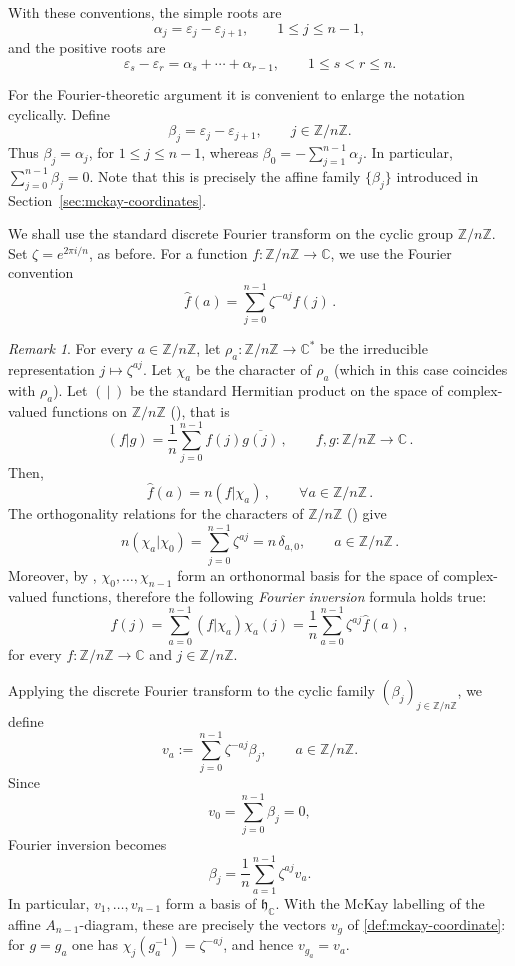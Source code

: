 \documentclass[a4paper,reqno]{amsart}
\theoremstyle{plain} %
\theoremstyle{definition} %
\theoremstyle{remark} %
\newtheorem{rmk}[thm]{Remark}
\newcommand{\Z}{\mathbb{Z}}
\newcommand{\C}{\mathbb{C}}
\newcommand{\z}{\zeta}
\newcommand{\ve}{{\varepsilon}}
\newcommand{\1}{\mathds{1}}   %
\begin{document}
With these conventions, the simple roots are
\[
\alpha_j= \ve_j - \ve_{j+1},
\qquad 1\leq j\leq n-1,
\]
and the positive roots are
\[
\ve_s - \ve_r
=
\alpha_s+\cdots+\alpha_{r-1},
\qquad 1\leq s<r\leq n.
\]

For the Fourier-theoretic argument it is convenient to enlarge the
notation cyclically.  Define
\[
\beta_j = \ve_j - \ve_{j+1},
\qquad j\in\mathbb Z/n\mathbb Z.
\]
Thus $\beta_j=\alpha_j$, for $1\leq j\leq n-1$, whereas $\beta_0=-\sum_{j=1}^{n-1}\alpha_j$.
In particular, $\sum_{j=0}^{n-1}\beta_j=0$. 
Note that this is precisely the affine family \(\{\beta_j\}\) introduced in Section~\ref{sec:mckay-coordinates}.

We shall use the standard discrete Fourier transform on the cyclic
group $\mathbb Z/n\mathbb Z$.  Set $\z=e^{2\pi i/n}$, as before. 
For a function $f:\mathbb Z/n\mathbb Z\to\mathbb C$, we use the
Fourier convention
\[
\widehat f(a)
=
\sum_{j=0}^{n-1}\z^{-aj}f(j) \, .
\]
\begin{rmk}\label{FTRT}
For every $a\in \mathbb Z/n\mathbb Z$, let $\rho_a \colon \mathbb Z/n\mathbb Z \to \C^\ast$ be the irreducible representation
$j\mapsto \z^{aj}$. Let $\chi_a$ be the character of $\rho_a$ (which in this case coincides with $\rho_a$).
Let $(\, | \, )$ be the standard Hermitian product on the space of complex-valued functions on $\mathbb Z/n\mathbb Z$
(\cite[Sec. 2.3]{Serre77}), that is
\[
(f|g) = \frac{1}{n}\sum_{j=0}^{n-1}f(j)\overline{g(j)} \, , \qquad f, g \colon \mathbb Z/n\mathbb Z \to \C \, .
\]
Then, 
\[
\widehat f(a) = n(f|\chi_a) \, , \qquad \forall a\in \Z/n\Z \, .
\] 
The orthogonality relations for the characters of $\mathbb Z/n\mathbb Z$ (\cite[Thm. 3, Sec. 2.3]{Serre77}) give
\begin{equation}\label{ORC}
n(\chi_a | \chi_0)=\sum_{j=0}^{n-1}\z^{aj}
=
n\,\delta_{a,0},
\qquad a\in\mathbb Z/n\mathbb Z \, .
\end{equation}
Moreover, by \cite[Thm. 6, Sec. 2.5]{Serre77}, $\chi_0, \ldots, \chi_{n-1}$ form an orthonormal basis 
for the space of complex-valued functions, therefore the following \textit{Fourier inversion} formula holds true:
\begin{equation}\label{FI}
f(j)
= \sum_{a=0}^{n-1}(f|\chi_a)\chi_a(j)=
\frac1n\sum_{a=0}^{n-1}\z^{aj}\widehat f(a) \, ,
\end{equation}
for every $f\colon \Z/n\Z \to \C$ and $j\in \Z/n\Z$.
\end{rmk}
Applying the discrete Fourier transform to the cyclic family
$(\beta_j)_{j\in\mathbb Z/n\mathbb Z}$, we define
\[
v_a
:=
\sum_{j=0}^{n-1}\z^{-aj}\beta_j,
\qquad a\in\mathbb Z/n\mathbb Z.
\]
Since
\[
v_0=\sum_{j=0}^{n-1}\beta_j=0,
\]
Fourier inversion becomes
\begin{equation}\label{FIb}
\beta_j
=
\frac1n\sum_{a=1}^{n-1}\z^{aj}v_a.
\end{equation}
In particular, $v_1,\ldots,v_{n-1}$ form a basis of
$\mathfrak h_{\mathbb C}$. With the McKay labelling of the affine
$A_{n-1}$-diagram, these are precisely the vectors $v_g$ of
\eqref{def:mckay-coordinate}: for $g=g_a$ one has
$\chi_j(g_a^{-1})=\z^{-aj}$, and hence $v_{g_a}=v_a$.
\end{document}
